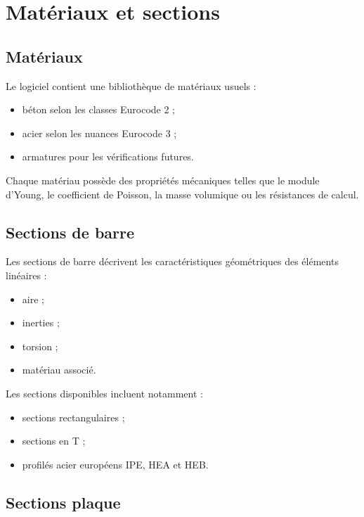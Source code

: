\chapter{Matériaux et sections}

\section{Matériaux}

Le logiciel contient une bibliothèque de matériaux usuels :

\begin{itemize}
  \item béton selon les classes Eurocode 2 ;
  \item acier selon les nuances Eurocode 3 ;
  \item armatures pour les vérifications futures.
\end{itemize}

Chaque matériau possède des propriétés mécaniques telles que le module d'Young,
le coefficient de Poisson, la masse volumique ou les résistances de calcul.

\section{Sections de barre}

Les sections de barre décrivent les caractéristiques géométriques des éléments
linéaires :

\begin{itemize}
  \item aire ;
  \item inerties ;
  \item torsion ;
  \item matériau associé.
\end{itemize}

Les sections disponibles incluent notamment :

\begin{itemize}
  \item sections rectangulaires ;
  \item sections en T ;
  \item profilés acier européens IPE, HEA et HEB.
\end{itemize}

\section{Sections plaque}

